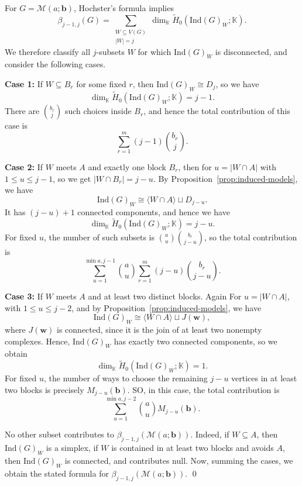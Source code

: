 \documentclass[12pt]{article}
\renewenvironment{proof}{{\bf \noindent Proof.}}{\qed}
\theoremstyle{definition}
\theoremstyle{remark}
\newcommand{\kk}{\mathbb{K}}
\newcommand{\MM}{\mathcal{M}}
\newcommand{\ind}{\mathrm{Ind}}
\newcommand{\bk}[1]{\mathbf{#1}}
\newcommand{\wt}{\widetilde}
\begin{document}
	\begin{proof}
		For $G=\MM(a;\bk{b})$, Hochster's formula implies
		$$
		\beta_{j-1,j}(G)=\sum_{\substack{W\subseteq V(G)\\ |W|=j}}
		\dim_{\kk}\wt H_0(\ind(G)_W;\kk).
		$$
		We therefore classify all $j$-subsets $W$ for which $\ind(G)_W$ is disconnected, and consider the following cases.
		
		\smallskip
		
		\noindent\textbf{Case 1:} If $W\subseteq B_r$ for some fixed $r$, then $\ind(G)_W\cong D_j$, so we have
		$$
		\dim_{\kk}\wt H_0(\ind(G)_W;\kk)=j-1.
		$$
		There are $\binom{b_r}{j}$ such choices inside $B_r$, and hence the total contribution of this case is
		$$
		\sum_{r=1}^m (j-1)\binom{b_r}{j}.
		$$
		
		\smallskip
		
		\noindent\textbf{Case 2:} If $W$ meets $A$ and exactly one block $B_r$, then for $u=|W\cap A|$ with $1\leq u\leq j-1$, so we get $|W\cap B_r|=j-u$. By Proposition~\ref{prop:induced-models}, we have
		$$
		\ind(G)_W\cong \langle W\cap A\rangle \sqcup D_{j-u}.
		$$
		It has $(j-u)+1$ connected components, and hence we have
		$$
		\dim_{\kk}\wt H_0(\ind(G)_W;\kk)=j-u.
		$$
		For fixed $u$, the number of such subsets is $\binom{a}{u}\binom{b_r}{j-u}$, so the total contribution is
		$$
		\sum_{u=1}^{\min{a,j-1}}
		\binom{a}{u}
		\sum_{r=1}^m (j-u)\binom{b_r}{j-u}.
		$$
		
		\smallskip
		
		\noindent\textbf{Case 3:} If $W$ meets $A$ and at least two distinct blocks. Again For $u=|W\cap A|$, with $1\leq u\leq j-2$, and by Proposition~\ref{prop:induced-models}, we have
		$$
		\ind(G)_W\cong \langle W\cap A\rangle \sqcup J(\bk{w}),
		$$
		where $J(\bk{w})$ is connected, since it is the join of at least two nonempty complexes. Hence, $\ind(G)_W$ has exactly two connected components, so we obtain
		$$
		\dim_{\kk}\wt H_0(\ind(G)_W;\kk)=1.
		$$
		For fixed $u$, the number of ways to choose the remaining $j-u$ vertices in at least two blocks is precisely $M_{j-u}(\bk{b})$. SO, in this  case, the total  contribution is
		$$
		\sum_{u=1}^{\min{a,j-2}}
		\binom{a}{u}M_{j-u}(\bk{b}).
		$$
		
		\smallskip
		 No other subset contributes to $\beta_{j-1,j}(\MM(a;\bk{b}))$. Indeed, if $W\subseteq A$, then $\ind(G)_W$ is a simplex, if $W$ is contained in at least two blocks and avoids $A$, then $\ind(G)_W$ is connected, and contributes null. Now, summing the cases, we obtain the stated formula for $\beta_{j-1,j}(\MM(a;\bk{b})).$
	\end{proof}
	
\end{document}
